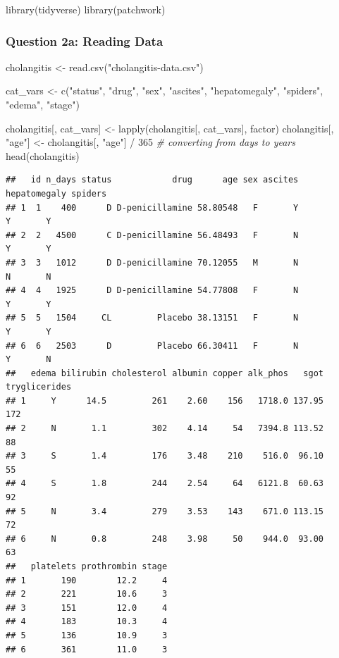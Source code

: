 \documentclass[
]{article}
\newenvironment{Shaded}{\begin{snugshade}}{\end{snugshade}}
\newcommand{\CommentTok}[1]{\textcolor[rgb]{0.56,0.35,0.01}{\textit{#1}}}
\newcommand{\DecValTok}[1]{\textcolor[rgb]{0.00,0.00,0.81}{#1}}
\newcommand{\FunctionTok}[1]{\textcolor[rgb]{0.00,0.00,0.00}{#1}}
\newcommand{\NormalTok}[1]{#1}
\newcommand{\OtherTok}[1]{\textcolor[rgb]{0.56,0.35,0.01}{#1}}
\newcommand{\SpecialCharTok}[1]{\textcolor[rgb]{0.00,0.00,0.00}{#1}}
\newcommand{\StringTok}[1]{\textcolor[rgb]{0.31,0.60,0.02}{#1}}
\begin{document}
\begin{Shaded}
\begin{Highlighting}[]
\FunctionTok{library}\NormalTok{(tidyverse)}
\FunctionTok{library}\NormalTok{(patchwork)}
\end{Highlighting}
\end{Shaded}

\hypertarget{question-2a-reading-data}{%
\subsubsection{Question 2a: Reading
Data}\label{question-2a-reading-data}}

\begin{Shaded}
\begin{Highlighting}[]
\NormalTok{cholangitis }\OtherTok{\textless{}{-}} \FunctionTok{read.csv}\NormalTok{(}\StringTok{"cholangitis{-}data.csv"}\NormalTok{)}

\NormalTok{cat\_vars }\OtherTok{\textless{}{-}} \FunctionTok{c}\NormalTok{(}\StringTok{"status"}\NormalTok{, }\StringTok{"drug"}\NormalTok{, }\StringTok{"sex"}\NormalTok{, }\StringTok{"ascites"}\NormalTok{, }\StringTok{"hepatomegaly"}\NormalTok{, }\StringTok{"spiders"}\NormalTok{, }\StringTok{"edema"}\NormalTok{, }\StringTok{"stage"}\NormalTok{)}

\NormalTok{cholangitis[, cat\_vars] }\OtherTok{\textless{}{-}} \FunctionTok{lapply}\NormalTok{(cholangitis[, cat\_vars], factor)}
\NormalTok{cholangitis[, }\StringTok{"age"}\NormalTok{] }\OtherTok{\textless{}{-}}\NormalTok{ cholangitis[, }\StringTok{"age"}\NormalTok{] }\SpecialCharTok{/} \DecValTok{365} \CommentTok{\# converting from days to years}
\FunctionTok{head}\NormalTok{(cholangitis)}
\end{Highlighting}
\end{Shaded}

\begin{verbatim}
##   id n_days status            drug      age sex ascites hepatomegaly spiders
## 1  1    400      D D-penicillamine 58.80548   F       Y            Y       Y
## 2  2   4500      C D-penicillamine 56.48493   F       N            Y       Y
## 3  3   1012      D D-penicillamine 70.12055   M       N            N       N
## 4  4   1925      D D-penicillamine 54.77808   F       N            Y       Y
## 5  5   1504     CL         Placebo 38.13151   F       N            Y       Y
## 6  6   2503      D         Placebo 66.30411   F       N            Y       N
##   edema bilirubin cholesterol albumin copper alk_phos   sgot tryglicerides
## 1     Y      14.5         261    2.60    156   1718.0 137.95           172
## 2     N       1.1         302    4.14     54   7394.8 113.52            88
## 3     S       1.4         176    3.48    210    516.0  96.10            55
## 4     S       1.8         244    2.54     64   6121.8  60.63            92
## 5     N       3.4         279    3.53    143    671.0 113.15            72
## 6     N       0.8         248    3.98     50    944.0  93.00            63
##   platelets prothrombin stage
## 1       190        12.2     4
## 2       221        10.6     3
## 3       151        12.0     4
## 4       183        10.3     4
## 5       136        10.9     3
## 6       361        11.0     3
\end{verbatim}
\end{document}
